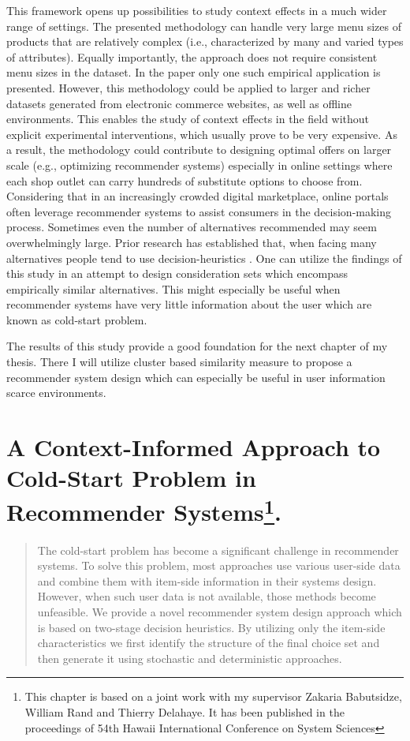 \documentclass[a4paper,12pt]{article}
\begin{document}
This framework opens up possibilities to study context effects in a much wider range of settings. The presented methodology can handle very large menu sizes of products that are relatively complex (i.e., characterized by many and varied types of attributes). Equally importantly, the approach does not require consistent menu sizes in the dataset. In the paper only one such empirical application is presented. However, this methodology could be applied to larger and richer datasets generated from electronic commerce websites, as well as offline environments. This enables the study of context effects in the field without explicit experimental interventions, which usually prove to be very expensive. As a result, the methodology could contribute to designing optimal offers on larger scale (e.g., optimizing recommender systems) especially in online settings where each shop outlet can carry hundreds of substitute options to choose from. Considering that in an increasingly crowded digital marketplace, online portals often leverage recommender systems to assist consumers in the decision-making process. Sometimes even the number of alternatives recommended may seem overwhelmingly large. Prior research has established that, when facing many alternatives people tend to use decision-heuristics \citep{fishburn1974exceptional}. One can utilize the findings of this study in an attempt to design consideration sets which encompass empirically similar alternatives. This might especially be useful when recommender systems have very little information about the user which are known as cold-start problem. 

The results of this study provide a good foundation for the next chapter of my thesis. There I will utilize cluster based similarity measure to propose a recommender system design which can especially be useful in user information scarce environments.




\newpage
\section{A Context-Informed Approach to Cold-Start Problem in Recommender Systems\footnote{This chapter is based on a joint work with my supervisor Zakaria Babutsidze, William Rand and Thierry Delahaye. It has been published in the proceedings of 54th Hawaii International Conference on System Sciences}.}\label{chapter:hicssPaper}

\begin{abstract}
        The cold-start problem has become a significant challenge in recommender systems. To solve this problem, most approaches use various user-side data  and combine them with item-side information in their systems design. However, when such user data is not available, those methods become unfeasible. We provide a novel recommender system design approach which is based on two-stage decision heuristics. By utilizing only the item-side characteristics we first identify the structure of the final choice set and then generate it using stochastic and deterministic approaches.
        
\end{abstract}
\end{document}
